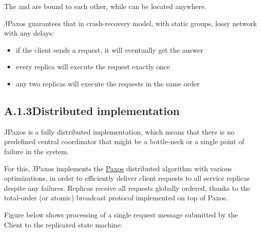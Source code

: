 The  and  are bound to each other, while
 can be located anywhere.

JPaxos guarantees that in crash-recovery model, with static groups,
lossy network with any delays:
\begin{itemize}
\item {} 
if the client sends a request, it will eventually get the answer

\item {} 
every replica will execute the request exactly once

\item {} 
any two replicas will execute the requests in the same order

\end{itemize}


\subsection*{A.1.3\quad Distributed implementation}
\label{overview:distributed-implementation}
JPaxos is a fully distributed implementation, which means that there
is no predefined central coordinator that might be a bottle-neck or a single
point of failure in the system.

For this, JPaxos implements
the \href{http://en.wikipedia.org/wiki/Paxos\_algorithm}{Paxos}
distributed algorithm with various optimizations, in order to efficiently
deliver client requests to all service replicas despite any failures.
Replicas receive all requests globally ordered, thanks to
the total-order (or atomic) broadcast protocol implemented on top
of Paxos.

Figure below shows processing of a single request message submitted
by the Client to the replicated state machine:
\begin{quote}
\begin{figure}[htbp]
\centering

\end{figure}
\end{quote}

